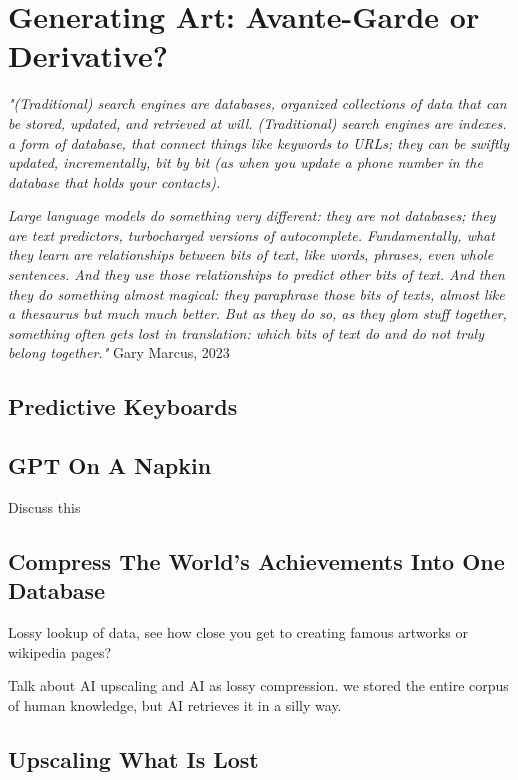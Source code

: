 \setchapterpreamble[u]{\margintoc}
\chapter{Generating Art: Avante-Garde or Derivative?}

\textit{"(Traditional) search engines are databases, organized collections of data that can be stored, updated, and retrieved at will. (Traditional) search engines are indexes. a form of database, that connect things like keywords to URLs; they can be swiftly updated, incrementally, bit by bit (as when you update a phone number in the database that holds your contacts).}

\textit{Large language models do something very different: they are not databases; they are text predictors, turbocharged versions of autocomplete. Fundamentally, what they learn are relationships between bits of text, like words, phrases, even whole sentences. And they use those relationships to predict other bits of text. And then they do something almost magical: they paraphrase those bits of texts, almost like a thesaurus but much much better. But as they do so, as they glom stuff together, something often gets lost in translation: which bits of text do and do not truly belong together."} Gary Marcus, 2023 \cite{marcus2023}

\section{Predictive Keyboards}

\section{GPT On A Napkin}

Discuss this 

\section{Compress The World's Achievements Into One Database}


Lossy lookup of data, see how close you get to creating famous artworks or wikipedia pages?

Talk about AI upscaling and AI as lossy compression. we stored the entire corpus of human knowledge, but AI retrieves it in a silly way.

\section{Upscaling What Is Lost}

